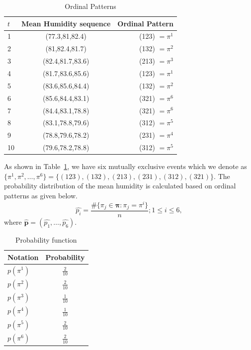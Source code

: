 
\begin{table}[H]
	\centering
	\begin{tabular}{lcr}
		\toprule
		$t$ & Mean Humidity sequence & Ordinal Pattern \\
		\midrule
		1 & (77.3,81,82.4) & (123) $=\pi^1$\\ 
		2 & (81,82.4,81.7) & (132) $=\pi^2$\\
		3 & (82.4,81.7,83.6) & (213) $=\pi^3$\\
		4 & (81.7,83.6,85.6) & (123) $=\pi^1$ \\
		5 & (83.6,85.6,84.4) & (132) $=\pi^2$\\ 
		6 & (85.6,84.4,83.1) & (321) $=\pi^6$\\
		7 & (84.4,83.1,78.8) & (321) $=\pi^6$\\
		8 & (83.1,78.8,79.6) & (312) $=\pi^5$\\ 
		9 & (78.8,79.6,78.2) & (231) $=\pi^4$\\
		10 & (79.6,78.2,78.8) & (312) $=\pi^5$\\
		\bottomrule
	\end{tabular}
	\caption{Ordinal Patterns}
	\label{tab:op}
\end{table}

As shown in Table~\ref{tab:op}, we have six mutually exclusive events which we denote as   
$\{{\pi}^1, {\pi}^2,\dots, {\pi}^{6}\}= \{(123),(132),(213),(231),(312),(321)\}$. 
The probability distribution of the mean humidity is calculated based on ordinal patterns as given below.
\begin{equation}
	\hat{p_i}=\frac{\#\{\pi_j \in \bm{\pi}: \pi_j=\pi^{i}\}}{n}; 1\le i \le 6,
\end{equation}
where $\hat{\bm{p}}=(\hat{p_1}, \dots ,\hat{p_6})$.

\begin{table}[hbt]
	\centering
	\begin{tabular}{lc}
		\toprule
		Notation & Probability \\ 
		\midrule
		$p(\pi^1)$ & $\frac{2}{10}$ \\ 
		$p(\pi^2)$ & $\frac{2}{10}$ \\
		$p(\pi^3)$ & $\frac{1}{10}$ \\
		$p(\pi^4)$ & $\frac{1}{10}$ \\
		$p(\pi^5)$ & $\frac{2}{10}$ \\ 
		$p(\pi^6)$ & $\frac{2}{10}$ \\
		\bottomrule
	\end{tabular}
	\caption{Probability function}
	\label{tab:probability_function}
\end{table}

